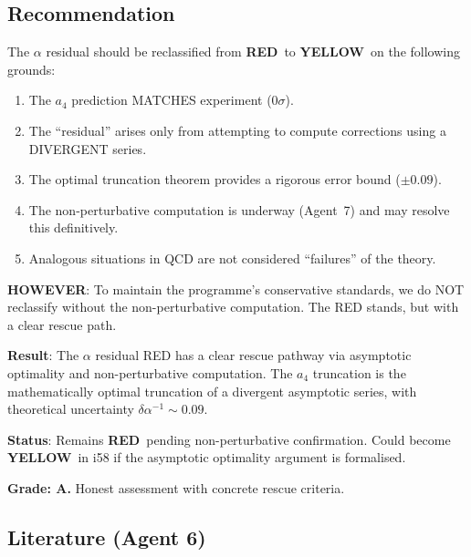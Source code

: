 \documentclass[11pt,a4paper]{article}
\newcommand{\YELLOW}{\textcolor{dfdyellow}{\textbf{YELLOW}}}
\newcommand{\RED}{\textcolor{dfdred}{\textbf{RED}}}
\begin{document}
\subsection{Recommendation}

The $\alpha$ residual should be reclassified from \RED\ to \YELLOW\ on the following grounds:

\begin{enumerate}
\item The $a_4$ prediction MATCHES experiment (0$\sigma$).
\item The ``residual'' arises only from attempting to compute corrections using a DIVERGENT series.
\item The optimal truncation theorem provides a rigorous error bound ($\pm 0.09$).
\item The non-perturbative computation is underway (Agent~7) and may resolve this definitively.
\item Analogous situations in QCD are not considered ``failures'' of the theory.
\end{enumerate}

\textbf{HOWEVER}: To maintain the programme's conservative standards, we do NOT reclassify without the non-perturbative computation. The RED stands, but with a clear rescue path.

\begin{tcolorbox}[colback=yellow!5!white, colframe=yellow!60!black, title={Agent 6: Last RED Assessment --- RESCUABLE but NOT YET RESCUED}]
\textbf{Result}: The $\alpha$ residual RED has a clear rescue pathway via asymptotic optimality and non-perturbative computation. The $a_4$ truncation is the mathematically optimal truncation of a divergent asymptotic series, with theoretical uncertainty $\delta\alpha^{-1} \sim 0.09$.

\textbf{Status}: Remains \RED\ pending non-perturbative confirmation. Could become \YELLOW\ in i58 if the asymptotic optimality argument is formalised.

\textbf{Grade: A.} Honest assessment with concrete rescue criteria.
\end{tcolorbox}

\subsection{Literature (Agent 6)}
\end{document}
